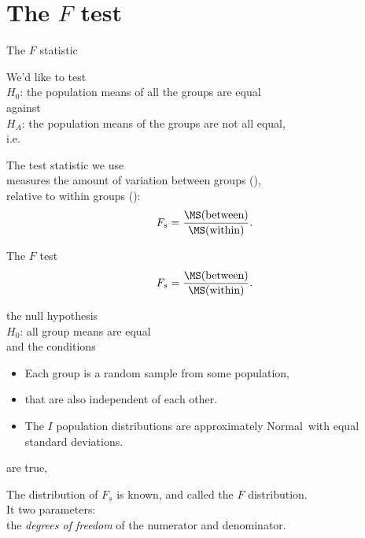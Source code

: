 \section{The $F$ test}

\begin{frame}{The $F$ statistic}

  We'd like to test\\
    \hspace{2em} $H_0$: the population means of all the groups are equal \\
  against \\
    \hspace{2em} $H_A$: the population means of the groups are not all equal, \\
  i.e.\ 

  \vspace{2em}

    The \alert{test statistic} we use \\
    measures the amount of variation between groups (), \\
    relative to within groups ():
    \[
        F_s = \frac{ \MS(\text{between}) }{ \MS(\text{within}) } .
    \]

\end{frame}

\begin{frame}{The $F$ test}
    \[
        F_s = \frac{ \MS(\text{between}) }{ \MS(\text{within}) } .
    \]
    \vspace{2em}

     the null hypothesis\\
    \hspace{3em} $H_0$: all group means are equal \\
    and the conditions
    \begin{itemize}
      \item Each group is a random sample from some population,
      \item that are also independent of each other.
      \item The $I$ population distributions are approximately Normal\
        with equal standard deviations.
    \end{itemize}
    are true, 

    \vspace{2em}

    The distribution of $F_s$ is known, and called 
    the \alert{$F$ distribution}. \\
    It  two parameters: \\
    the \emph{degrees of freedom} of the numerator and denominator.


\end{frame}


